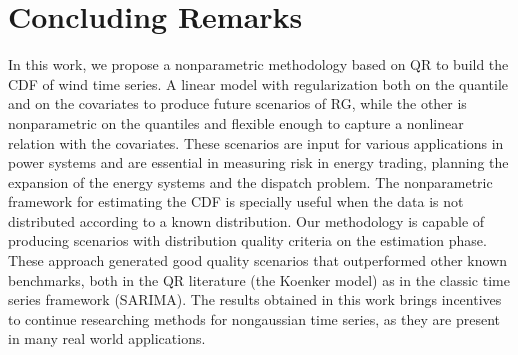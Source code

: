 \section{Concluding Remarks}

In this work, we propose a nonparametric methodology based on QR to build the CDF of wind time series.  A linear model with regularization both on the quantile and on the covariates to produce future scenarios of RG, while the other is nonparametric on the quantiles and flexible enough to capture a nonlinear relation with the covariates. These scenarios are input for various applications in power systems and are essential in measuring risk in energy trading, planning the expansion of the energy systems and the dispatch problem. The nonparametric framework for estimating the CDF is specially useful when the data is not distributed according to a known distribution. 
Our methodology is capable of producing scenarios with distribution quality criteria on the estimation phase.  
These approach generated good quality scenarios that outperformed other known benchmarks, both in the QR literature (the Koenker model) as in the classic time series framework (SARIMA). 
The results obtained in this work brings incentives to continue researching methods for nongaussian time series, as they are present in many real world applications. 